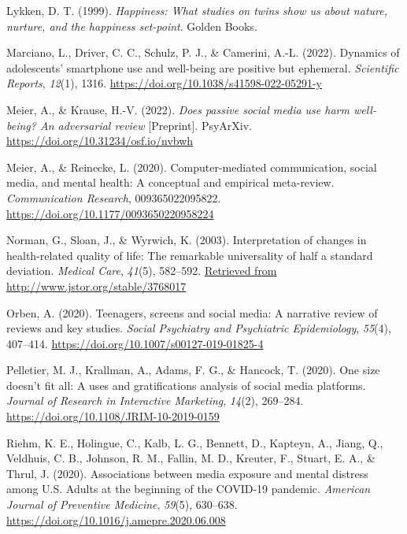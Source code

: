 \documentclass[
  man,floatsintext]{apa7}
\newlength{\cslhangindent}
\newlength{\cslentryspacingunit} %
\newenvironment{CSLReferences}[2] %
 {%
  \setlength{\parindent}{0pt}
  \ifodd #1
  \let\oldpar\par
  \def\par{\hangindent=\cslhangindent\oldpar}
  \fi
  \setlength{\parskip}{#2\cslentryspacingunit}
 }%
 {}
\begin{document}
\begin{CSLReferences}{1}{0}
\leavevmode{}%
Lykken, D. T. (1999). \emph{Happiness: {What} studies on twins show us about nature, nurture, and the happiness set-point}. {Golden Books}.

\leavevmode{}%
Marciano, L., Driver, C. C., Schulz, P. J., \& Camerini, A.-L. (2022). Dynamics of adolescents' smartphone use and well-being are positive but ephemeral. \emph{Scientific Reports}, \emph{12}(1), 1316. \url{https://doi.org/10.1038/s41598-022-05291-y}

\leavevmode{}%
Meier, A., \& Krause, H.-V. (2022). \emph{Does passive social media use harm well-being? {An} adversarial review} {[}Preprint{]}. {PsyArXiv}. \url{https://doi.org/10.31234/osf.io/nvbwh}

\leavevmode{}%
Meier, A., \& Reinecke, L. (2020). Computer-mediated communication, social media, and mental health: {A} conceptual and empirical meta-review. \emph{Communication Research}, 009365022095822. \url{https://doi.org/10.1177/0093650220958224}

\leavevmode{}%
Norman, G., Sloan, J., \& Wyrwich, K. (2003). Interpretation of changes in health-related quality of life: {The} remarkable universality of half a standard deviation. \emph{Medical Care}, \emph{41}(5), 582--592. \href{Retrieved\%20from\%20http://www.jstor.org/stable/3768017}{Retrieved from http://www.jstor.org/stable/3768017}

\leavevmode{}%
Orben, A. (2020). Teenagers, screens and social media: A narrative review of reviews and key studies. \emph{Social Psychiatry and Psychiatric Epidemiology}, \emph{55}(4), 407--414. \url{https://doi.org/10.1007/s00127-019-01825-4}

\leavevmode{}%
Pelletier, M. J., Krallman, A., Adams, F. G., \& Hancock, T. (2020). One size doesn't fit all: A uses and gratifications analysis of social media platforms. \emph{Journal of Research in Interactive Marketing}, \emph{14}(2), 269--284. \url{https://doi.org/10.1108/JRIM-10-2019-0159}

\leavevmode{}%
Riehm, K. E., Holingue, C., Kalb, L. G., Bennett, D., Kapteyn, A., Jiang, Q., Veldhuis, C. B., Johnson, R. M., Fallin, M. D., Kreuter, F., Stuart, E. A., \& Thrul, J. (2020). Associations between media exposure and mental distress among {U}.{S}. Adults at the beginning of the {COVID-19} pandemic. \emph{American Journal of Preventive Medicine}, \emph{59}(5), 630--638. \url{https://doi.org/10.1016/j.amepre.2020.06.008}


\end{CSLReferences}
\end{document}
